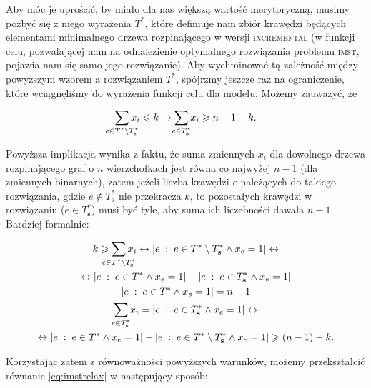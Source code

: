 Aby móc je uprościć, by miało dla nas większą wartość merytoryczną, musimy pozbyć się z niego wyrażenia $T^{\ast}$, które definiuje nam zbiór krawędzi będących elementami minimalnego drzewa rozpinającego w wersji \textsc{incremental} (w funkcji celu, pozwalającej nam na odnalezienie optymalnego rozwiązania problemu \textsc{imst}, pojawia nam się samo jego rozwiązanie). Aby wyeliminować tą zależność między powyższym wzorem a rozwiązaniem $T^{\ast}$, spójrzmy jeszcze raz na ograniczenie, które wciągnęliśmy do wyrażenia funkcji celu dla modelu. Możemy zauważyć, że

\begin{gather}
	\sum_{\mathclap{e \in T^{\ast} \setminus T^{\ast}_{\textbf{s}}}} x_{i} \leqslant k \rightarrow \sum_{\mathclap{e \in T^{\ast}_{\textbf{s}}}} x_{i} \geqslant n - 1 - k\text{.}
\end{gather}


Powyższa implikacja wynika z faktu, że suma zmiennych $x_{i}$ dla dowolnego drzewa rozpinającego graf o $n$ wierzchołkach jest równa co najwyżej $n - 1$ (dla zmiennych binarnych), zatem jeżeli liczba krawędzi $e$ należących do takiego rozwiązania, gdzie $e \notin T^{\ast}_{\textbf{s}}$ nie przekracza $k$, to pozostałych krawędzi w rozwiązaniu ($e \in T^{\ast}_{\textbf{s}}$) musi być tyle, aby suma ich liczebności dawała $n - 1$. Bardziej formalnie:

\begin{gather}
	k \geqslant \sum_{\mathclap{e \in T^{\ast} \setminus T^{\ast}_{\textbf{s}}}} x_{i} \leftrightarrow \left| e \; : \; e \in T^{\ast} \setminus T^{\ast}_{\textbf{s}} \wedge x_{e} = 1 \right| \leftrightarrow\\
	\leftrightarrow \left| e \; : \; e \in T^{\ast} \wedge x_{e} = 1 \right| - \left| e \; : \; e \in T^{\ast}_{\textbf{s}} \wedge x_{e} = 1 \right|\\
	\left| e \; : \; e \in T^{\ast} \wedge x_{e} = 1 \right| = n - 1\\
	\sum_{\mathclap{e \in T^{\ast}_{\textbf{s}}}} x_{i} = \left| e \; : \; e \in T^{\ast}_{\textbf{s}} \wedge x_{e} = 1 \right| \leftrightarrow\\
	\leftrightarrow \left| e \; : \; e \in T^{\ast} \wedge x_{e} = 1 \right| - \left| e \; : \; e \in T^{\ast} \setminus T^{\ast}_{\textbf{s}} \wedge x_{e} = 1 \right| \geqslant \left( n - 1 \right) - k\text{.}
\end{gather}

Korzystając zatem z równoważności powyższych warunków, możemy przekształcić równanie \ref{eq:imstrelax} w następujący sposób:

